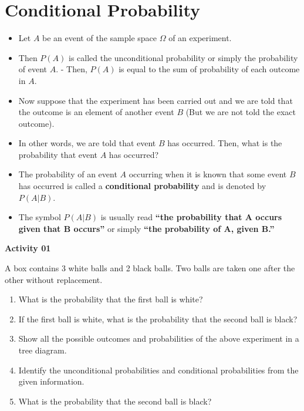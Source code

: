 \documentclass[]{book}
\providecommand{\tightlist}{%
  \setlength{\itemsep}{0pt}\setlength{\parskip}{0pt}}
\begin{document}
\hypertarget{conditional-probability}{%
\section{Conditional Probability}\label{conditional-probability}}

\begin{itemize}
\item
  Let \(A\) be an event of the sample space \(\Omega\) of an experiment.
\item
  Then \(P(A)\) is called the unconditional probability or simply the probability of event \(A\). - Then, \(P(A)\) is equal to the sum of probability of each outcome in \(A\).
\item
  Now suppose that the experiment has been carried out and we are told that the outcome is an element of another event \(B\) (But we are not told the exact outcome).
\item
  In other words, we are told that event \(B\) has occurred. Then, what is the probability that event \(A\) has occurred?
\item
  The probability of an event \(A\) occurring when it is known that some event \(B\) has occurred is called a \textbf{conditional probability} and is denoted by \(P(A|B)\).
\item
  The symbol \(P(A|B)\) is usually read \textbf{``the probability that A occurs given that B occurs''} or simply \textbf{``the probability of A, given B.''}
\end{itemize}

\textbf{Activity 01}

A box contains 3 white balls and 2 black balls. Two balls are taken one after the other without replacement.

\begin{enumerate}
\def\labelenumi{\alph{enumi})}
\tightlist
\item
  What is the probability that the first ball is white?
\item
  If the first ball is white, what is the probability that the second ball is black?
\item
  Show all the possible outcomes and probabilities of the above experiment in a tree diagram.
\item
  Identify the unconditional probabilities and conditional probabilities from the given information.
\item
  What is the probability that the second ball is black?
\end{enumerate}
\end{document}
